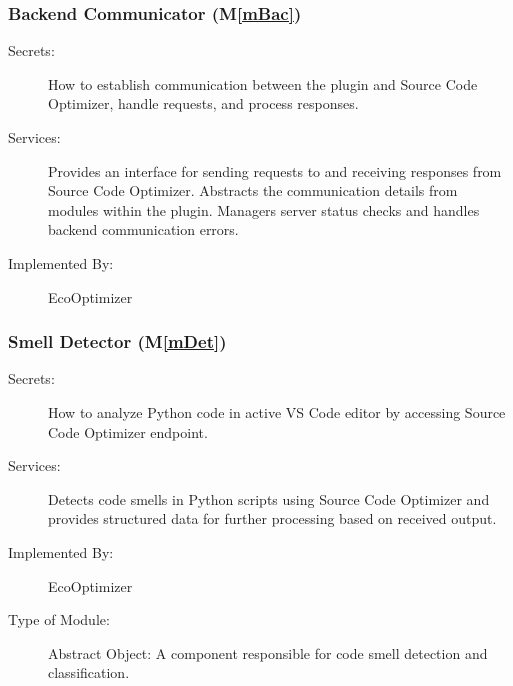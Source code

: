 \documentclass[12pt, titlepage]{article}
\newcommand{\mref}[1]{M\ref{#1}}
\begin{document}
\subsubsection{Backend Communicator (\mref{mBac})}


\begin{description}
    \item[Secrets:] How to establish communication between the plugin and Source Code Optimizer, handle requests, and process responses.
    \item[Services:] Provides an interface for sending requests to and receiving responses from Source Code Optimizer. Abstracts the communication details from modules within the plugin. Managers server status checks and handles backend communication errors.
    \item[Implemented By:] EcoOptimizer
\end{description}

\subsubsection{Smell Detector (\mref{mDet})}


\begin{description}
    \item[Secrets:] How to analyze Python code in active VS Code editor by accessing Source Code Optimizer endpoint.
    \item[Services:] Detects code smells in Python scripts using Source Code Optimizer and provides structured data for further processing based on received output.
    \item[Implemented By:] EcoOptimizer
    \item[Type of Module:] Abstract Object: A component responsible for code smell detection and classification.
\end{description}
\end{document}
